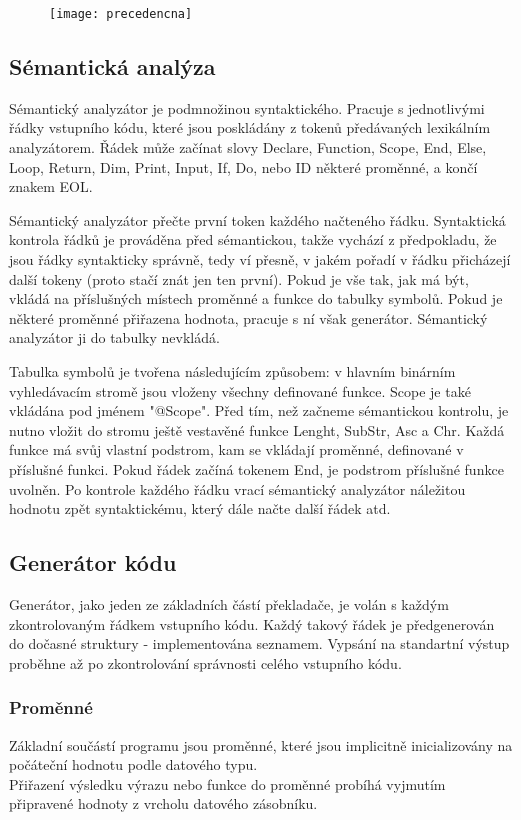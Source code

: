 \documentclass[11pt, a4paper]{article}
\begin{document}
		 \begin{figure}[h]
		\begin{center}
		\texttt{[image: precedencna]}	
		\end{center}
		\end{figure}	
 

\subsection{Sémantická analýza}

Sémantický analyzátor je podmnožinou syntaktického. Pracuje s jednotlivými řádky vstupního kódu, které jsou poskládány z tokenů předávaných lexikálním analyzátorem. Řádek může začínat slovy Declare, Function, Scope, End, Else, Loop, Return, Dim, Print, Input, If, Do, nebo ID některé proměnné, a končí znakem EOL.

Sémantický analyzátor přečte první token každého načteného řádku. Syntaktická kontrola řádků je prováděna před sémantickou, takže vychází z předpokladu, že jsou řádky syntakticky správně, tedy ví přesně, v jakém pořadí v řádku přicházejí další tokeny (proto stačí znát jen ten první). Pokud je vše tak, jak má být, vkládá na příslušných místech proměnné a funkce do tabulky symbolů. Pokud je některé proměnné přiřazena hodnota, pracuje s ní však generátor. Sémantický analyzátor ji do tabulky nevkládá.

Tabulka symbolů je tvořena následujícím způsobem: v hlavním binárním vyhledávacím stromě jsou vloženy všechny definované funkce. Scope je také vkládána pod jménem "@Scope". Před tím, než začneme sémantickou kontrolu, je nutno vložit do stromu ještě vestavěné funkce Lenght, SubStr, Asc a Chr. Každá funkce má svůj vlastní podstrom, kam se vkládají proměnné, definované v příslušné funkci. Pokud řádek začíná tokenem End, je podstrom příslušné funkce uvolněn. Po kontrole každého řádku vrací sémantický analyzátor náležitou hodnotu zpět syntaktickému, který dále načte další řádek atd.
	\subsection{Generátor kódu}
Generátor, jako jeden ze základních částí překladače, je volán s každým zkontrolovaným řádkem vstupního kódu. Každý takový řádek je předgenerován do dočasné struktury - implementována seznamem. Vypsání na standartní výstup proběhne až po zkontrolování správnosti celého vstupního kódu.
    \subsubsection{Proměnné}
    Základní součástí programu jsou proměnné, které jsou implicitně inicializovány na počáteční hodnotu podle datového typu.\\
    \indent Přiřazení výsledku výrazu nebo funkce do proměnné probíhá vyjmutím připravené hodnoty z vrcholu datového zásobníku.
\end{document}
